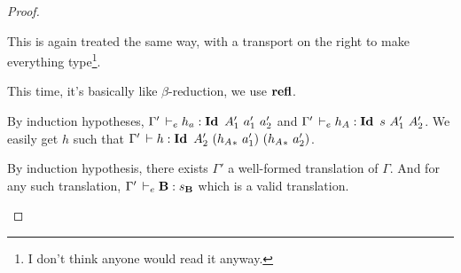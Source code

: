 \documentclass[a4paper,english]{lipics-utf8x}
\begin{document}
\begin{proof}
\begin{caselist}
      \begin{graycase}
        \begin{mathc}
        \end{mathc}
        This is again treated the same way, with a transport on the right to
        make everything
        type\footnote{I don't think anyone would read it anyway.}.
      \end{graycase}

      \begin{graycase}
        \begin{mathc}
        \end{mathc}
        This time, it's basically like $\beta$-reduction, we use $\operatorname{\mathbf{refl}}$.
      \end{graycase}

      \begin{graycase}
        \begin{mathc}
        \end{mathc}
        By induction hypotheses, $\Gamma' \,\vdash_e h_a : \operatorname{\mathbf{Id}~} A'_1\ a'_1\ a'_2$
        and $\Gamma' \,\vdash_e h_A : \operatorname{\mathbf{Id}~} s\ A'_1\ A'_2$.
        We easily get $h$ such that $\Gamma' \der h : \Id A'_2\ %
        ({h_A}_*\ a'_1)\ ({h_A}_*\ a'_2)$.
      \end{graycase}

      \nextcase
      \begin{mathc}
        \ru{\derr \Gamma
          }{\Gamma \derr \mR : \sB}
      \end{mathc}
      By induction hypothesis, there exists $\Gamma'$ a well-formed translation
      of $\Gamma$. And for any such translation, $\Gamma' \,\vdash_e \operatorname{\mathbf{B}} : s_{\operatorname{\mathbf{B}}}$
      which is a valid translation.


\end{caselist}
\end{proof}
\end{document}
